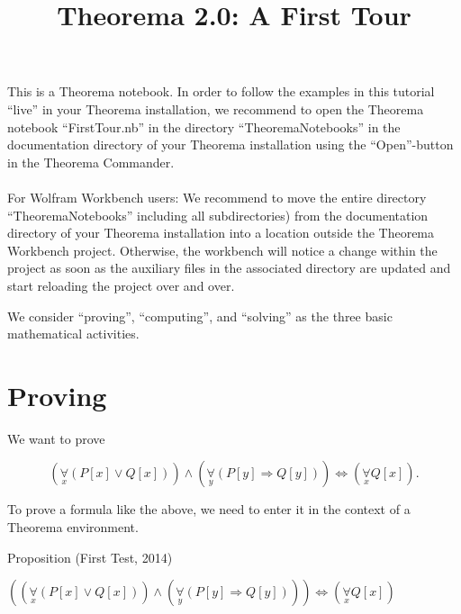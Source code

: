 \documentclass{article}
\begin{document}
\title{Theorema 2.0: A First Tour}
\author{}
\date{}
\maketitle

This is a Theorema notebook. 
In order to follow the examples in this tutorial {``}live{''} in your Theorema installation, we recommend to open the Theorema notebook {``}FirstTour.nb{''}
in the directory {``}TheoremaNotebooks{''} in the { }documentation directory of your Theorema installation using the {``}Open{''}-button in the Theorema
Commander.\\
 \\
\hspace*{0.5ex} For Wolfram Workbench users: We recommend to move the entire directory {``}TheoremaNotebooks{''} including all subdirectories) from
the { }documentation directory of your Theorema installation into a location outside the Theorema Workbench project. Otherwise, the workbench will
notice a change within the project as soon as the auxiliary files in the associated directory are updated and start reloading the project over and
over.

We consider {``}proving{''}, {``}computing{''}, and {``}solving{''} as the three basic mathematical activities.

\section*{Proving}

We want to prove

\[\left(\underset{x}{\forall }(P[x]\lor Q[x])\right)\land \left(\underset{y}{\forall }(P[y]\Rightarrow Q[y])\right)\Leftrightarrow \left(\underset{x}{\forall
}Q[x]\right) .\]

To prove a formula like the above, we need to enter it in the context of a Theorema environment.



Proposition (First Test, 2014)

\(\left(\left(\underset{x}{\forall }(P[x]\lor Q[x])\right)\land \left(\underset{y}{\forall }(P[y]\Rightarrow Q[y])\right)\right)\Leftrightarrow \left(\underset{x}{\forall
}Q[x]\right)\)
\end{document}
